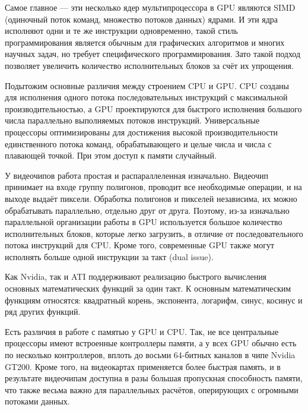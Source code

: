 Самое главное — эти несколько ядер мультипроцессора в GPU являются SIMD (одиночный поток команд, множество потоков данных) ядрами. И эти ядра исполняют одни и те же инструкции одновременно, такой стиль программирования является обычным для графических алгоритмов и многих научных задач, но требует специфического программирования. Зато такой подход позволяет увеличить количество исполнительных блоков за счёт их упрощения.

Подытожим основные различия между строением CPU и GPU. CPU созданы для исполнения одного потока последовательных инструкций с максимальной производительностью, а GPU проектируются для быстрого исполнения большого числа параллельно выполняемых потоков инструкций. Универсальные процессоры оптимизированы для достижения высокой производительности единственного потока команд, обрабатывающего и целые числа и числа с плавающей точкой. При этом доступ к памяти случайный. 

У видеочипов работа простая и распараллеленная изначально. Видеочип принимает на входе группу полигонов, проводит все необходимые операции, и на выходе выдаёт пиксели. Обработка полигонов и пикселей независима, их можно обрабатывать параллельно, отдельно друг от друга. Поэтому, из-за изначально параллельной организации работы в GPU используется большое количество исполнительных блоков, которые легко загрузить, в отличие от последовательного потока инструкций для CPU. Кроме того, современные GPU также могут исполнять больше одной инструкции за такт (dual issue).

Как Nvidia, так и ATI поддерживают реализацию быстрого вычисления основных математических функций за один такт. К основным математическим функциям относятся: квадратный корень, экспонента, логарифм, синус, косинус и ряд других функций.

Есть различия в работе с памятью у GPU и CPU. Так, не все центральные процессоры имеют встроенные контроллеры памяти, а у всех GPU обычно есть по несколько контроллеров, вплоть до восьми 64-битных каналов в чипе Nvidia GT200. Кроме того, на видеокартах применяется более быстрая память, и в результате видеочипам доступна в разы большая пропускная способность памяти, что также весьма важно для параллельных расчётов, оперирующих с огромными потоками данных.

